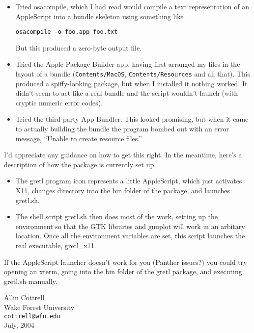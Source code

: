 \documentclass[11pt]{article}
\begin{document}
\begin{itemize}
\item Tried \textsf{osacompile}, which I had read would compile a text
  representation of an AppleScript into a bundle skeleton using
  something like

\texttt{osacompile -o foo.app foo.txt}

But this produced a zero-byte output file.
\item Tried the Apple \textsf{Package Builder} app, having first arranged my
  files in the layout of a bundle (\texttt{Contents/MacOS},
  \texttt{Contents/Resources} and all that).  This produced a
  spiffy-looking package, but when I installed it nothing worked.  It
  didn't seem to act like a real bundle and the script wouldn't launch
  (with cryptic numeric error codes).
\item Tried the third-party \textsf{App Bundler}.  This looked
  promising, but when it came to actually building the bundle the
  program bombed out with an error message, ``Unable to create
  resource files.''
\end{itemize}

I'd appreciate any guidance on how to get this right.  In the
meantime, here's a description of how the package is currently set up.

\begin{itemize}
\item The gretl program icon represents a little AppleScript, which
  just activates X11, changes directory into the \textsf{bin} folder
  of the package, and launches \textsf{gretl.sh}.
\item The shell script \textsf{gretl.sh} then does most of the work,
  setting up the environment so that the \textsf{GTK} libraries and
  \textsf{gnuplot} will work in an arbitary location.  Once all the
  environment variables are set, this script launches the real
  executable, \textsf{gretl\_x11}.
\end{itemize}

If the AppleScript launcher doesn't work for you (Panther issues?) you
could try opening an xterm, going into the \textsf{bin} folder of the
gretl package, and executing \textsf{gretl.sh} manually. 

\vspace{.25in}

\raggedright
Allin Cottrell \\
Wake Forest University \\
\texttt{cottrell@wfu.edu} \\
July, 2004
\end{document}
